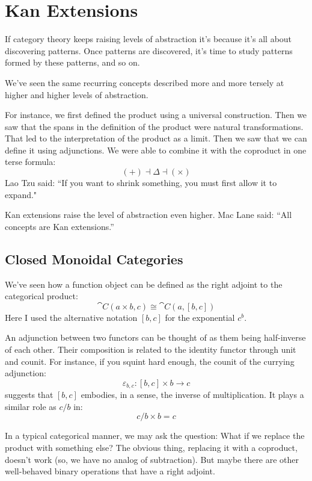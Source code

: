 \documentclass[DaoFP]{subfiles}
\begin{document}
\setcounter{chapter}{18}

\chapter{Kan Extensions}

If category theory keeps raising levels of abstraction it's because it's all about discovering patterns. Once patterns are discovered, it's time to study patterns formed by these patterns, and so on. 

We've seen the same recurring concepts described more and more tersely at higher and higher levels of abstraction. 

For instance, we first defined the product using a universal construction. Then we saw that the spans in the definition of the product were natural transformations. That led to the interpretation of the product as a limit. Then we saw that we can define it using adjunctions. We were able to combine it with the coproduct in one terse formula:
\[ (+) \dashv \Delta \dashv (\times) \]
Lao Tzu said: ``If you want to shrink something, you must first allow it to expand."

Kan extensions raise the level of abstraction even higher. Mac Lane said: ``All concepts are Kan extensions.''

\section{Closed Monoidal Categories}

We've seen how a function object can be defined as the right adjoint to the categorical product:
\[ \cat C (a \times b, c) \cong \cat C (a, [b, c]) \]
Here I used the alternative notation $[b, c]$ for the exponential $c^b$. 

An adjunction between two functors can be thought of as them being half-inverse of each other. Their composition is related to the identity functor through unit and counit. For instance, if you squint hard enough, the counit of the currying adjunction:
\[ \varepsilon_{b, c} \colon [b, c] \times b \to c \]
suggests that $[b, c]$ embodies, in a sense, the inverse of multiplication. It plays a similar role as $c/b$ in:
\[ c/b \times b = c \]

In a typical categorical manner, we may ask the question: What if we replace the product with something else? The obvious thing, replacing it with a coproduct, doesn't work (so, we have no analog of subtraction). But maybe there are other well-behaved binary operations that have a right adjoint.
\end{document}
